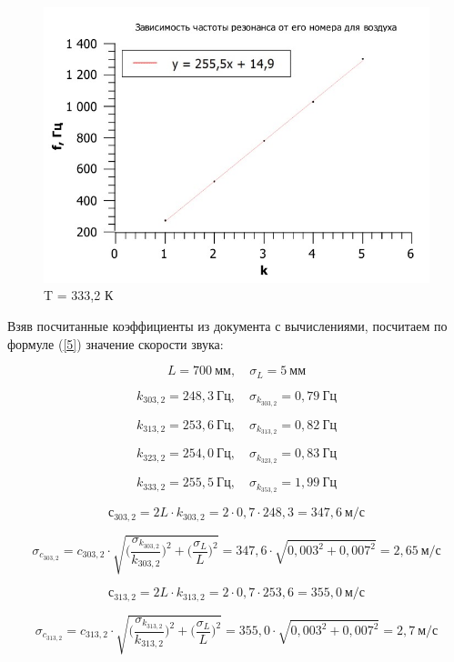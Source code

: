 \documentclass[12pt,a4paper]{article}
\begin{document}
\begin{figure}[h!]
\centering
\includegraphics[scale=0.4]{V_9-1.jpg}
\caption{T = 333,2 К}
\label{fig:Experimental setup}
\end{figure}

\vspace{0.5cm}

Взяв посчитанные коэффициенты из документа с вычислениями, посчитаем по формуле (\ref{5}) значение скорости звука:

\[L = 700 \: \textit{мм}, \quad \sigma_L = 5 \: \textit{мм}\]

\[k_{303,2} = 248,3 \: \textit{Гц}, \quad \sigma_{k_{303,2}} = 0,79 \: \textit{Гц}\]

\[k_{313,2} = 253,6 \: \textit{Гц}, \quad \sigma_{k_{313,2}} = 0,82 \: \textit{Гц}\]

\[k_{323,2} = 254,0 \: \textit{Гц}, \quad \sigma_{k_{323,2}} = 0,83 \: \textit{Гц}\]

\[k_{333,2} = 255,5 \: \textit{Гц}, \quad \sigma_{k_{353,2}} = 1,99 \: \textit{Гц}\]

\[с_{303,2} = 2L \cdot k_{303,2} = 2 \cdot 0,7 \cdot 248,3 = 347,6 \: \textit{м} / \textit{с}\]

\[\sigma_{c_{303,2}} = c_{303,2} \cdot \sqrt{\Big( \frac{\sigma_{k_{303,2}}}{k_{303,2}}\Big) ^2 + \Big( \frac{\sigma_L}{L}\Big) ^2} = 347,6 \cdot \sqrt{0,003^2 + 0,007^2} = 2,65 \: \textit{м} / \textit{с}\]

\[с_{313,2} = 2L \cdot k_{313,2} = 2 \cdot 0,7 \cdot 253,6 = 355,0 \: \textit{м} / \textit{с}\]

\[\sigma_{c_{313,2}} = c_{313,2} \cdot \sqrt{\Big( \frac{\sigma_{k_{313,2}}}{k_{313,2}}\Big) ^2 + \Big( \frac{\sigma_L}{L}\Big) ^2} = 355,0 \cdot \sqrt{0,003^2 + 0,007^2} = 2,7 \: \textit{м} / \textit{с}\]
\end{document}
